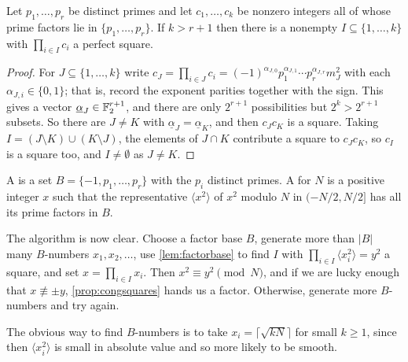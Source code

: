 \documentclass[a4paper]{scrartcl}
\begin{document}
\begin{lemma}\label{lem:factorbase}
	Let $p_1, \dots, p_r$ be distinct primes and let $c_1, \dots, c_k$ be nonzero integers all of whose prime factors lie in $\{p_1, \dots, p_r\}$. If $k > r+1$ then there is a nonempty $I \subseteq \{1, \dots, k\}$ with $\prod_{i \in I}c_i$ a perfect square.
\end{lemma}
\begin{proof}
	For $J \subseteq \{1, \dots, k\}$ write $c_J = \prod_{i \in J}c_i = (-1)^{\alpha_{J,0}}p_1^{\alpha_{J,1}}\cdots p_r^{\alpha_{J,r}}m_J^2$ with each $\alpha_{J,i} \in \{0,1\}$; that is, record the exponent parities together with the sign. This gives a vector $\underline\alpha_J \in \mathbb{F}_2^{r+1}$, and there are only $2^{r+1}$ possibilities but $2^k > 2^{r+1}$ subsets. So there are $J \neq K$ with $\underline\alpha_J = \underline\alpha_K$, and then $c_Jc_K$ is a square. Taking $I = (J\setminus K)\cup(K\setminus J)$, the elements of $J \cap K$ contribute a square to $c_Jc_K$, so $c_I$ is a square too, and $I \neq \emptyset$ as $J \neq K$.
\end{proof}

\begin{definition}
	A  is a set $B = \{-1, p_1, \dots, p_r\}$ with the $p_i$ distinct primes. A  for $N$ is a positive integer $x$ such that the representative $\langle x^2\rangle$ of $x^2$ modulo $N$ in $(-N/2, N/2]$ has all its prime factors in $B$.
\end{definition}

The algorithm is now clear. Choose a factor base $B$, generate more than $|B|$ many $B$-numbers $x_1, x_2, \dots$, use \autoref{lem:factorbase} to find $I$ with $\prod_{i \in I}\langle x_i^2\rangle = y^2$ a square, and set $x = \prod_{i \in I}x_i$. Then $x^2 \equiv y^2 \pmod N$, and if we are lucky enough that $x \not\equiv\pm y$, \autoref{prop:congsquares} hands us a factor. Otherwise, generate more $B$-numbers and try again.

The obvious way to find $B$-numbers is to take $x_i = \lceil\sqrt{kN}\rceil$ for small $k \geq 1$, since then $\langle x_i^2\rangle$ is small in absolute value and so more likely to be smooth.
\end{document}
